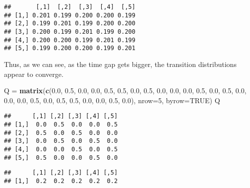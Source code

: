 \documentclass[
]{book}
\newenvironment{Shaded}{\begin{snugshade}}{\end{snugshade}}
\newcommand{\DataTypeTok}[1]{\textcolor[rgb]{0.13,0.29,0.53}{#1}}
\newcommand{\DecValTok}[1]{\textcolor[rgb]{0.00,0.00,0.81}{#1}}
\newcommand{\FloatTok}[1]{\textcolor[rgb]{0.00,0.00,0.81}{#1}}
\newcommand{\KeywordTok}[1]{\textcolor[rgb]{0.13,0.29,0.53}{\textbf{#1}}}
\newcommand{\NormalTok}[1]{#1}
\newcommand{\OperatorTok}[1]{\textcolor[rgb]{0.81,0.36,0.00}{\textbf{#1}}}
\newcommand{\OtherTok}[1]{\textcolor[rgb]{0.56,0.35,0.01}{#1}}
\newcommand{\StringTok}[1]{\textcolor[rgb]{0.31,0.60,0.02}{#1}}
\begin{document}
\begin{verbatim}
##       [,1]  [,2]  [,3]  [,4]  [,5]
## [1,] 0.201 0.199 0.200 0.200 0.199
## [2,] 0.199 0.201 0.199 0.200 0.200
## [3,] 0.200 0.199 0.201 0.199 0.200
## [4,] 0.200 0.200 0.199 0.201 0.199
## [5,] 0.199 0.200 0.200 0.199 0.201
\end{verbatim}

Thus, as we can see, as the time gap gets bigger, the transition distributions appear to converge.

\begin{Shaded}
\begin{Highlighting}[]
\NormalTok{Q =}\StringTok{ }\KeywordTok{matrix}\NormalTok{(}\KeywordTok{c}\NormalTok{(}\FloatTok{0.0}\NormalTok{, }\FloatTok{0.5}\NormalTok{, }\FloatTok{0.0}\NormalTok{, }\FloatTok{0.0}\NormalTok{, }\FloatTok{0.5}\NormalTok{,}
             \FloatTok{0.5}\NormalTok{, }\FloatTok{0.0}\NormalTok{, }\FloatTok{0.5}\NormalTok{, }\FloatTok{0.0}\NormalTok{, }\FloatTok{0.0}\NormalTok{,}
             \FloatTok{0.0}\NormalTok{, }\FloatTok{0.5}\NormalTok{, }\FloatTok{0.0}\NormalTok{, }\FloatTok{0.5}\NormalTok{, }\FloatTok{0.0}\NormalTok{,}
             \FloatTok{0.0}\NormalTok{, }\FloatTok{0.0}\NormalTok{, }\FloatTok{0.5}\NormalTok{, }\FloatTok{0.0}\NormalTok{, }\FloatTok{0.5}\NormalTok{,}
             \FloatTok{0.5}\NormalTok{, }\FloatTok{0.0}\NormalTok{, }\FloatTok{0.0}\NormalTok{, }\FloatTok{0.5}\NormalTok{, }\FloatTok{0.0}\NormalTok{), }
           \DataTypeTok{nrow=}\DecValTok{5}\NormalTok{, }\DataTypeTok{byrow=}\OtherTok{TRUE}\NormalTok{)}
\NormalTok{Q}
\end{Highlighting}
\end{Shaded}

\begin{verbatim}
##      [,1] [,2] [,3] [,4] [,5]
## [1,]  0.0  0.5  0.0  0.0  0.5
## [2,]  0.5  0.0  0.5  0.0  0.0
## [3,]  0.0  0.5  0.0  0.5  0.0
## [4,]  0.0  0.0  0.5  0.0  0.5
## [5,]  0.5  0.0  0.0  0.5  0.0
\end{verbatim}

\begin{Shaded}
\end{Shaded}

\begin{verbatim}
##      [,1] [,2] [,3] [,4] [,5]
## [1,]  0.2  0.2  0.2  0.2  0.2
\end{verbatim}
\end{document}
